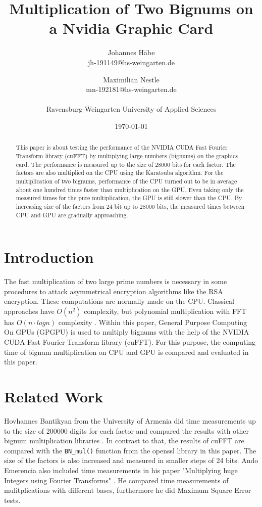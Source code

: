 \documentclass[12pt,a4paper]{article}
\title{Multiplication of Two Bignums on a Nvidia Graphic Card}
\author{Johannes H\"abe  \\
	jh-191149@hs-weingarten.de
	\and 
	Maximilian Nestle \\
	mn-192181@hs-weingarten.de \\\\
	Ravensburg-Weingarten University of Applied Sciences
	}
\date{\today}
\begin{document}
\maketitle
%
\begin{abstract}
This paper is about testing the performance of the NVIDIA CUDA Fast Fourier Transform library (cuFFT) by multiplying large numbers (bignums) on the graphics card. The performance is measured up to the size of 28000 bits for each factor. The factors are also multiplied on the CPU using the Karatsuba algorithm. For the multiplication of two bignums, performance of the CPU turned out to be in average about one hundred times faster than multiplication on the GPU. Even taking only the measured times for the pure multiplication, the GPU is still slower than the CPU. By increasing size of the factors from 24 bit up to 28000 bits, the measured times between CPU and GPU are gradually approaching.
\end{abstract}

\section{Introduction}
The fast multiplication of two large prime numbers is necessary in some procedures to attack asymmetrical encryption algorithms like the RSA encryption. These computations are normally made on the CPU. Classical approaches have $O(n^2)$ complexity, but polynomial multiplication with FFT has $O(n \cdot logn)$ complexity \cite{bantikyan2014big}. Within this paper, General Purpose Computing On GPUs (GPGPU) is used to multiply bignums with the help of the NVIDIA CUDA Fast Fourier Transform library (cuFFT). For this purpose, the computing time of bignum multiplication on CPU and GPU is compared and evaluated in this paper.

\section{Related Work}
Hovhannes Bantikyan from the University of Armenia did time measurements up to the size of 200000 digits for each factor and compared the results with other bignum multiplication libraries \cite{bantikyan2014big}. In contrast to that, the results of cuFFT are compared with the \texttt{BN_mul()} function from the openssl library in this paper. The size of the factors is also increased and measured in smaller steps of 24 bits. Ando Emerencia also included time measurements in his paper "Multiplying huge Integers using Fourier Transforms" \cite{emerencia2007multiplying}. He compared time measurements of mulitplications with different bases, furthermore he did Maximum Square Error tests.
\end{document}
